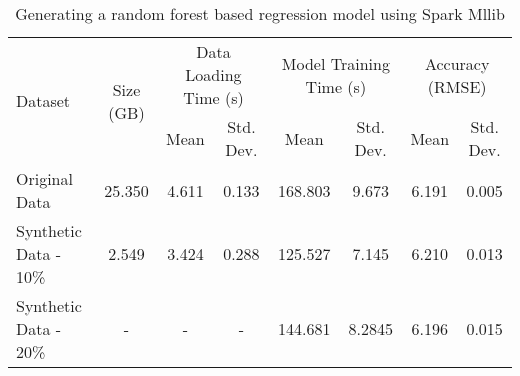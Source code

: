 \begin{table*}
    \renewcommand{\arraystretch}{1.3}
    \caption{Generating a random forest based regression model using Spark Mllib}
    \label{tab:resource-util}
    \begin{center}
        \begin{tabularx}{0.98\textwidth}{|X|c|c|c|c|c|c|c|}
            \hline
            \multirow{2}{*}{Dataset} & \multirow{2}{*}{Size (GB)} & \multicolumn{2}{c|}{\cellcolor[gray]{0.7}Data Loading Time (s)} &\multicolumn{2}{c|}{\cellcolor[gray]{0.7}Model Training Time (s)} & \multicolumn{2}{c|}{\cellcolor[gray]{0.7}Accuracy (RMSE)}\\
            \cline{3-8}
             & & \cellcolor[gray]{0.9}Mean & \cellcolor[gray]{0.9}Std. Dev.  &  \cellcolor[gray]{0.9}Mean & \cellcolor[gray]{0.9}Std. Dev. &  \cellcolor[gray]{0.9}Mean & \cellcolor[gray]{0.9}Std. Dev. \\
            \hline
            Original Data & 25.350 & 4.611 & 0.133 & 168.803 & 9.673 & 6.191 & 0.005 \\
            \hline
            Synthetic Data - 10\% & 2.549 & 3.424 & 0.288 & 125.527 & 7.145 & 6.210 & 0.013 \\
            \hline
            Synthetic Data - 20\% & - & - & - & 144.681 & 8.2845 & 6.196 & 0.015 \\
            \hline
		\end{tabularx}
	\end{center}
\end{table*}
